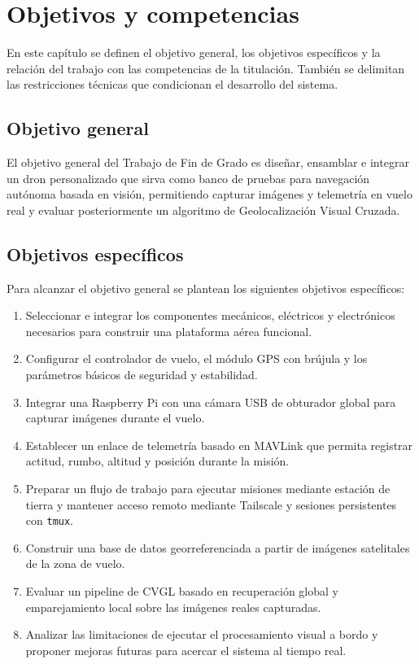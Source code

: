 
\chapter{Objetivos y competencias}
\label{cap:objetivos-competencias}

\begin{Resumen}
En este capítulo se definen el objetivo general, los objetivos específicos y la relación del trabajo con las competencias de la titulación. También se delimitan las restricciones técnicas que condicionan el desarrollo del sistema.
\end{Resumen}

\section{Objetivo general}
\label{sec:objetivo-general}

El objetivo general del Trabajo de Fin de Grado es diseñar, ensamblar e integrar un dron personalizado que sirva como banco de pruebas para navegación autónoma basada en visión, permitiendo capturar imágenes y telemetría en vuelo real y evaluar posteriormente un algoritmo de Geolocalización Visual Cruzada.

\section{Objetivos específicos}
\label{sec:objetivos-especificos}

Para alcanzar el objetivo general se plantean los siguientes objetivos específicos:

\begin{enumerate}
\item Seleccionar e integrar los componentes mecánicos, eléctricos y electrónicos necesarios para construir una plataforma aérea funcional.
\item Configurar el controlador de vuelo, el módulo GPS con brújula y los parámetros básicos de seguridad y estabilidad.
\item Integrar una Raspberry Pi con una cámara USB de obturador global para capturar imágenes durante el vuelo.
\item Establecer un enlace de telemetría basado en MAVLink que permita registrar actitud, rumbo, altitud y posición durante la misión.
\item Preparar un flujo de trabajo para ejecutar misiones mediante estación de tierra y mantener acceso remoto mediante Tailscale y sesiones persistentes con \texttt{tmux}.
\item Construir una base de datos georreferenciada a partir de imágenes satelitales de la zona de vuelo.
\item Evaluar un pipeline de CVGL basado en recuperación global y emparejamiento local sobre las imágenes reales capturadas.
\item Analizar las limitaciones de ejecutar el procesamiento visual a bordo y proponer mejoras futuras para acercar el sistema al tiempo real.
\end{enumerate}

